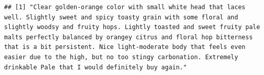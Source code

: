 \documentclass[
  a4paper,
]{article}
\newenvironment{Shaded}{\begin{snugshade}}{\end{snugshade}}
\newcommand{\CommentTok}[1]{\textcolor[rgb]{0.56,0.35,0.01}{\textit{#1}}}
\newcommand{\ControlFlowTok}[1]{\textcolor[rgb]{0.13,0.29,0.53}{\textbf{#1}}}
\newcommand{\DecValTok}[1]{\textcolor[rgb]{0.00,0.00,0.81}{#1}}
\newcommand{\FunctionTok}[1]{\textcolor[rgb]{0.13,0.29,0.53}{\textbf{#1}}}
\newcommand{\NormalTok}[1]{#1}
\newcommand{\OtherTok}[1]{\textcolor[rgb]{0.56,0.35,0.01}{#1}}
\newcommand{\SpecialCharTok}[1]{\textcolor[rgb]{0.81,0.36,0.00}{\textbf{#1}}}
\newcommand{\StringTok}[1]{\textcolor[rgb]{0.31,0.60,0.02}{#1}}
\begin{document}
\begin{Shaded}
\end{Shaded}

\begin{verbatim}
## [1] "Clear golden-orange color with small white head that laces well. Slightly sweet and spicy toasty grain with some floral and slightly woodsy and fruity hops. Lightly toasted and sweet fruity pale malts perfectly balanced by orangey citrus and floral hop bitterness that is a bit persistent. Nice light-moderate body that feels even easier due to the high, but no too stingy carbonation. Extremely drinkable Pale that I would definitely buy again."
\end{verbatim}
\end{document}
